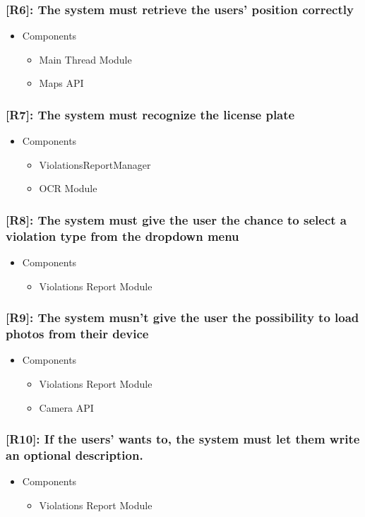 \documentclass[12pt,a4paper]{article}
\begin{document}
\subsubsection*{[R6]: The system must retrieve the users' position correctly}
\begin{itemize}
\item Components
\begin{itemize}
\item Main Thread Module
\item Maps API
\end{itemize}
\end{itemize}
\subsubsection*{[R7]: The system must recognize the license plate}
\begin{itemize}
\item Components
\begin{itemize}
\item ViolationsReportManager
\item OCR Module
\end{itemize}
\end{itemize}
\subsubsection*{[R8]: The system must give the user the chance to select a violation type from the dropdown menu}
\begin{itemize}
\item Components
\begin{itemize}
\item Violations Report Module
\end{itemize}
\end{itemize}
\subsubsection*{[R9]: The system musn't give the user the possibility to load photos from their device}
\begin{itemize}
\item Components
\begin{itemize}
\item Violations Report Module
\item Camera API
\end{itemize}
\end{itemize}
\subsubsection*{[R10]: If the users' wants to, the system must let them write an optional description.}
\begin{itemize}
\item Components
\begin{itemize}
\item Violations Report Module
\end{itemize}
\end{itemize}
\end{document}
